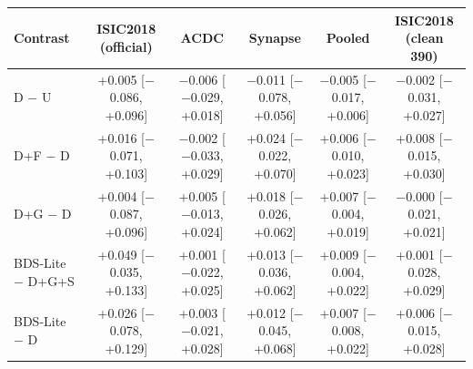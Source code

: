 \begin{tabular}{lccccc}
\toprule
Contrast & ISIC2018 (official) & ACDC & Synapse & Pooled & ISIC2018 (clean 390) \\
\midrule
D $-$ U & +0.005 [$-$0.086, +0.096] & $-$0.006 [$-$0.029, +0.018] & $-$0.011 [$-$0.078, +0.056] & $-$0.005 [$-$0.017, +0.006] & $-$0.002 [$-$0.031, +0.027] \\
D+F $-$ D & +0.016 [$-$0.071, +0.103] & $-$0.002 [$-$0.033, +0.029] & +0.024 [$-$0.022, +0.070] & +0.006 [$-$0.010, +0.023] & +0.008 [$-$0.015, +0.030] \\
D+G $-$ D & +0.004 [$-$0.087, +0.096] & +0.005 [$-$0.013, +0.024] & +0.018 [$-$0.026, +0.062] & +0.007 [$-$0.004, +0.019] & $-$0.000 [$-$0.021, +0.021] \\
BDS-Lite $-$ D+G+S & +0.049 [$-$0.035, +0.133] & +0.001 [$-$0.022, +0.025] & +0.013 [$-$0.036, +0.062] & +0.009 [$-$0.004, +0.022] & +0.001 [$-$0.028, +0.029] \\
BDS-Lite $-$ D & +0.026 [$-$0.078, +0.129] & +0.003 [$-$0.021, +0.028] & +0.012 [$-$0.045, +0.068] & +0.007 [$-$0.008, +0.022] & +0.006 [$-$0.015, +0.028] \\
\bottomrule
\end{tabular}
